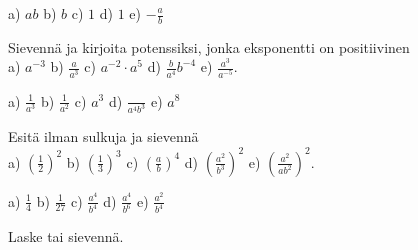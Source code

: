\begin{tehtavasivu}
\begin{tehtava}
        \begin{vastaus}
            a) $ab$ \qquad
            b) $b$ \qquad
            c) $1$ \qquad
            d) $1$ \qquad
            e) $-\frac{a}{b}$
        \end{vastaus}
    \end{tehtava}
    
   
    
    \begin{tehtava}
         Sievennä ja kirjoita potenssiksi, jonka eksponentti on positiivinen\\
        a) $a^{-3}$ \qquad
        b) $\frac{a}{a^3}$ \qquad
        c) $a^{-2}\cdot a^5$ \qquad
        d) $\frac{b}{a^4}b^{-4}$ \qquad
        e) $\frac{a^3}{a^{-5}}$.
        
        \begin{vastaus}
            a) $\frac{1}{a^3}$ \qquad
            b) $\frac{1}{a^2}$ \qquad
            c) $a^3$ \qquad
            d) $\frac{}{a^4b^3}$ \qquad
            e) $a^8$
        \end{vastaus}
    \end{tehtava}
    
    
    
    \begin{tehtava}
        Esitä ilman sulkuja ja sievennä \\
        a) $(\frac{1}{2})^2$ \qquad
        b) $(\frac{1}{3})^3$ \qquad
        c) $(\frac{a}{b})^4$ \qquad
        d) $(\frac{a^2}{b^3})^2$ \qquad
        e) $\left(\frac{a^2}{ab^2}\right)^2$.
        
        \begin{vastaus}
            a) $\frac{1}{4}$ \qquad
            b) $\frac{1}{27}$ \qquad
            c) $\frac{a^4}{b^4}$ \qquad
            d) $\frac{a^4}{b^6}$ \qquad
            e) $\frac{a^2}{b^4}$
        \end{vastaus}
    \end{tehtava}

Laske tai sievennä.
    \begin{tehtava}%
		\begin{alakohdatrivi}
		\end{alakohdatrivi}        
        \begin{vastaus}
        \begin{alakohdat}
        \end{alakohdat}
        \end{vastaus}
    \end{tehtava}


\end{tehtavasivu}
